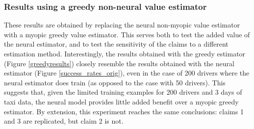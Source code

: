  \subsubsection{Results using a greedy non-neural value estimator}
\label{section:ablation}
These results are obtained by replacing the neural non-myopic value estimator with a myopic greedy value estimator. This serves both to test the added value of the neural estimator, and to test the sensitivity of the claims to a different estimation method. Interestingly, the results obtained with the greedy estimator (Figure \ref{greedyresults}) closely resemble the results obtained with the neural estimator (Figure \ref{success_rates_orig}), even in the case of 200 drivers where the neural estimator does train (as opposed to the case with 50 drivers). This suggests that, given the limited training examples for 200 drivers and 3 days of taxi data, the neural model provides little added benefit over a myopic greedy estimator. By extension, this experiment reaches the same conclusions: claims 1 and 3 are replicated, but claim 2 is not.

